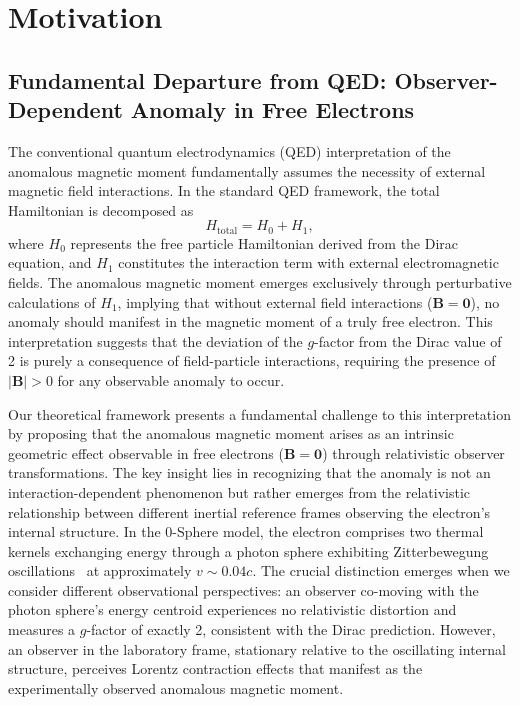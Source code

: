 \documentclass[%
 reprint,
 amsmath,amssymb,
 aps,
]{revtex4-1}
\numberwithin{equation}{section}%
\begin{document}
\section{Motivation}

\subsection{Fundamental Departure from QED: Observer-Dependent Anomaly in Free Electrons}

The conventional quantum electrodynamics (QED) interpretation of the anomalous magnetic moment fundamentally assumes the necessity of external magnetic field interactions. In the standard QED framework, the total Hamiltonian is decomposed as 
\begin{equation}
H_{\text{total}} = H_0 + H_1,
\end{equation}
where $H_0$ represents the free particle Hamiltonian derived from the Dirac equation, and $H_1$ constitutes the interaction term with external electromagnetic fields. The anomalous magnetic moment emerges exclusively through perturbative calculations of $H_1$, implying that without external field interactions ($\mathbf{B} = \mathbf{0}$), no anomaly should manifest in the magnetic moment of a truly free electron. This interpretation suggests that the deviation of the $g$-factor from the Dirac value of 2 is purely a consequence of field-particle interactions, requiring the presence of $|\mathbf{B}| > 0$ for any observable anomaly to occur.

Our theoretical framework presents a fundamental challenge to this interpretation by proposing that the anomalous magnetic moment arises as an intrinsic geometric effect observable in free electrons ($\mathbf{B} = \mathbf{0}$) through relativistic observer transformations. The key insight lies in recognizing that the anomaly is not an interaction-dependent phenomenon but rather emerges from the relativistic relationship between different inertial reference frames observing the electron's internal structure. In the 0-Sphere model, the electron comprises two thermal kernels exchanging energy through a photon sphere exhibiting Zitterbewegung oscillations~\cite{schrodinger1930} at approximately $v \sim 0.04c$. The crucial distinction emerges when we consider different observational perspectives: an observer co-moving with the photon sphere's energy centroid experiences no relativistic distortion and measures a $g$-factor of exactly 2, consistent with the Dirac prediction. However, an observer in the laboratory frame, stationary relative to the oscillating internal structure, perceives Lorentz contraction effects that manifest as the experimentally observed anomalous magnetic moment.
\end{document}
